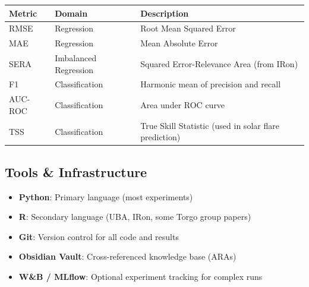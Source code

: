 {\def\LTcaptype{none} %
\small
\begin{longtable}[]{@{}
  >{\raggedright\arraybackslash}p{}
  >{\raggedright\arraybackslash}p{}
  >{\raggedright\arraybackslash}p{}@{}}
\toprule\noalign{}
\begin{minipage}[b]{\linewidth}\raggedright
Metric
\end{minipage} & \begin{minipage}[b]{\linewidth}\raggedright
Domain
\end{minipage} & \begin{minipage}[b]{\linewidth}\raggedright
Description
\end{minipage} \\
\midrule\noalign{}
\endhead
\bottomrule\noalign{}
\endlastfoot
RMSE & Regression & Root Mean Squared Error \\
MAE & Regression & Mean Absolute Error \\
SERA & Imbalanced Regression & Squared Error-Relevance Area (from
IRon) \\
F1 & Classification & Harmonic mean of precision and recall \\
AUC-ROC & Classification & Area under ROC curve \\
TSS & Classification & True Skill Statistic (used in solar flare
prediction) \\
\end{longtable}
}

\subsection{Tools \& Infrastructure}\label{tools-infrastructure}

\begin{itemize}
\tightlist
\item
  \textbf{Python}: Primary language (most experiments)
\item
  \textbf{R}: Secondary language (UBA, IRon, some Torgo group papers)
\item
  \textbf{Git}: Version control for all code and results
\item
  \textbf{Obsidian Vault}: Cross-referenced knowledge base (ARAs)
\item
  \textbf{W\&B / MLflow}: Optional experiment tracking for complex runs
\end{itemize}
